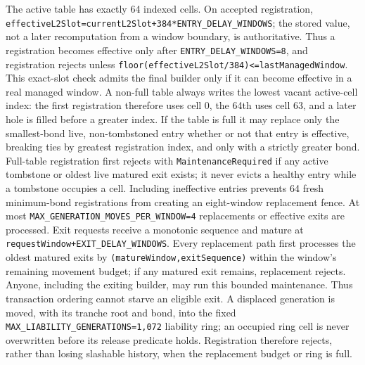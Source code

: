 \documentclass[a4paper,11pt]{article}
\newcommand{\code}[1]{\nolinkurl{#1}}
\begin{document}
The active table has exactly 64 indexed cells.  On accepted registration,
\code{effectiveL2Slot=currentL2Slot+384*ENTRY_DELAY_WINDOWS}; the stored value,
not a later recomputation from a window boundary, is authoritative.  Thus a
registration becomes effective only after \code{ENTRY_DELAY_WINDOWS=8}, and
registration rejects unless
\code{floor(effectiveL2Slot/384)<=lastManagedWindow}.  This exact-slot check
admits the final builder only if it can become effective in a real managed
window.  A
non-full table always writes the lowest vacant active-cell index: the first
registration therefore uses cell 0, the 64th uses cell 63, and a later hole is
filled before a greater index.  If the table is full it may replace only the
smallest-bond live, non-tombstoned entry whether or not that entry is effective,
breaking ties by greatest registration index, and only with a strictly greater
bond.  Full-table registration first rejects with \code{MaintenanceRequired}
if any active tombstone or oldest live matured exit exists; it never evicts a
healthy entry while a tombstone occupies a cell.  Including ineffective entries prevents 64 fresh minimum-bond
registrations from creating an eight-window replacement fence.  At most
\code{MAX_GENERATION_MOVES_PER_WINDOW=4} replacements or effective exits are
processed.  Exit requests receive a monotonic sequence and mature at
\code{requestWindow+EXIT_DELAY_WINDOWS}.  Every replacement path first processes
the oldest matured exits by \code{(matureWindow,exitSequence)} within the
window's remaining movement budget; if any matured exit remains, replacement
rejects.  Anyone, including the exiting builder, may run this bounded
maintenance.  Thus transaction ordering cannot starve an eligible exit.
A displaced
generation is moved, with its tranche root and bond, into the fixed
\code{MAX_LIABILITY_GENERATIONS=1,072} liability ring; an occupied ring cell is
never overwritten before its release predicate holds.  Registration therefore
rejects, rather than losing slashable history, when the replacement budget or
ring is full.
\end{document}
